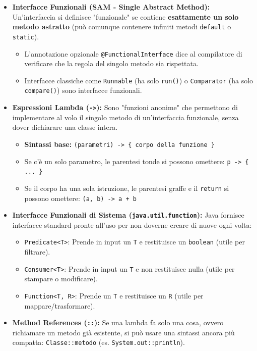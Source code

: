 \documentclass[12pt, a4paper]{article}
\begin{document}
\begin{itemize}
    \item \textbf{Interfacce Funzionali (SAM - Single Abstract Method):} 
    Un'interfaccia si definisce "funzionale" se contiene \textbf{esattamente un solo metodo astratto} (può comunque contenere infiniti metodi \texttt{default} o \texttt{static}). 
    \begin{itemize}
        \item L'annotazione opzionale \texttt{@FunctionalInterface} dice al compilatore di verificare che la regola del singolo metodo sia rispettata.
        \item Interfacce classiche come \texttt{Runnable} (ha solo \texttt{run()}) o \texttt{Comparator} (ha solo \texttt{compare()}) sono interfacce funzionali.
    \end{itemize}

    \item \textbf{Espressioni Lambda (\texttt{->}):}
    Sono "funzioni anonime" che permettono di implementare al volo il singolo metodo di un'interfaccia funzionale, senza dover dichiarare una classe intera. 
    \begin{itemize}
        \item \textbf{Sintassi base:} \texttt{(parametri) -> \{ corpo della funzione \}}
        \item Se c'è un solo parametro, le parentesi tonde si possono omettere: \texttt{p -> \{ ... \}}
        \item Se il corpo ha una sola istruzione, le parentesi graffe e il \texttt{return} si possono omettere: \texttt{(a, b) -> a + b}
    \end{itemize}

    \item \textbf{Interfacce Funzionali di Sistema (\texttt{java.util.function}):}
    Java fornisce interfacce standard pronte all'uso per non doverne creare di nuove ogni volta:
    \begin{itemize}
        \item \texttt{Predicate<T>}: Prende in input un \texttt{T} e restituisce un \texttt{boolean} (utile per filtrare).
        \item \texttt{Consumer<T>}: Prende in input un \texttt{T} e non restituisce nulla (utile per stampare o modificare).
        \item \texttt{Function<T, R>}: Prende un \texttt{T} e restituisce un \texttt{R} (utile per mappare/trasformare).
    \end{itemize}

    \item \textbf{Method References (\texttt{::}):} 
    Se una lambda fa solo una cosa, ovvero richiamare un metodo già esistente, si può usare una sintassi ancora più compatta: \texttt{Classe::metodo} (es. \texttt{System.out::println}).
\end{itemize}
\end{document}
